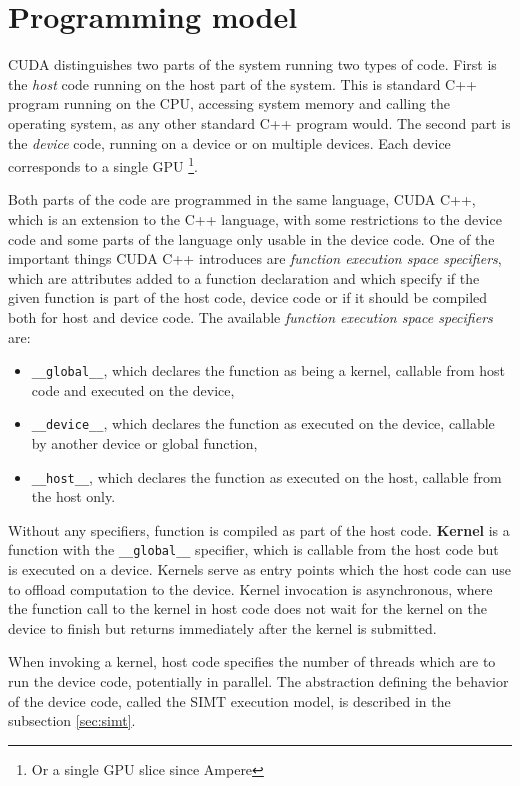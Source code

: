 \section{Programming model}
\label{sec:programming_model}

CUDA distinguishes two parts of the system running two types of code. First is the \textit{host} code running on the host part of the system. This is standard C++ program running on the CPU, accessing system memory and calling the operating system, as any other standard C++ program would. The second part is the \textit{device} code, running on a device or on multiple devices. Each device corresponds to a single GPU \footnote{Or a single GPU slice since Ampere}.

Both parts of the code are programmed in the same language, CUDA C++, which is an extension to the C++ language, with some restrictions to the device code and some parts of the language only usable in the device code.
One of the important things CUDA C++ introduces are \textit{function execution space specifiers}, which are attributes added to a function declaration and which specify if the given function is part of the host code, device code or if it should be compiled both for host and device code. The available \textit{function execution space specifiers} are:
\begin{itemize}
	\item \texttt{\_\_global\_\_}, which declares the function as being a kernel, callable from host code and executed on the device,
	\item \texttt{\_\_device\_\_}, which declares the function as executed on the device, callable by another device or global function,
	\item \texttt{\_\_host\_\_}, which declares the function as executed on the host, callable from the host only.
\end{itemize}

Without any specifiers, function is compiled as part of the host code. \textbf{Kernel} is a function with the \texttt{\_\_global\_\_} specifier, which is callable from the host code but is executed on a device. Kernels serve as entry points which the host code can use to offload computation to the device. Kernel invocation is asynchronous, where the function call to the kernel in host code does not wait for the kernel on the device to finish but returns immediately after the kernel is submitted.

When invoking a kernel, host code specifies the number of threads which are to run the device code, potentially in parallel. The abstraction defining the behavior of the device code, called the SIMT execution model, is described in the subsection \ref{sec:simt}.

